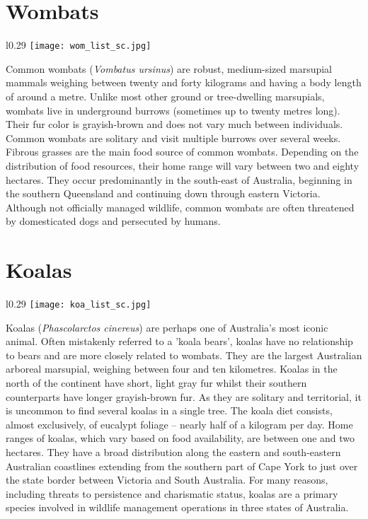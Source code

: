 \newpage
\section{Wombats}\label{wom}
\vspace{-0.3cm}
\setlength\intextsep{0pt}
\begin{wrapfigure}{l}{0.29\textwidth}
\centering
\texttt{[image: wom\_list\_sc.jpg]}
\end{wrapfigure}
Common wombats (\textit{Vombatus ursinus}) are robust, medium-sized marsupial mammals weighing between twenty and forty kilograms and having a body length of around a metre. Unlike most other ground or tree-dwelling marsupials, wombats live in underground burrows (sometimes up to twenty metres long). Their fur color is grayish-brown and does not vary much between individuals. Common wombats are solitary and visit multiple burrows over several weeks. Fibrous grasses are the main food source of common wombats. Depending on the distribution of food resources, their home range will vary between two and eighty hectares. They occur predominantly in the south-east of Australia, beginning in the southern Queensland and continuing down through eastern Victoria. Although not officially managed wildlife, common wombats are often threatened by domesticated dogs and persecuted by humans.

\section{Koalas}\label{koa}
\vspace{-0.3cm}
\setlength\intextsep{0pt}
\begin{wrapfigure}{l}{0.29\textwidth}
\centering
\texttt{[image: koa\_list\_sc.jpg]}
\end{wrapfigure}
Koalas (\textit{Phascolarctos cinereus}) are perhaps one of Australia's most iconic animal. Often mistakenly referred to a 'koala bears', koalas have no relationship to bears and are more closely related to wombats. They are the largest Australian arboreal marsupial, weighing between four and ten kilometres. Koalas in the north of the continent have short, light gray fur whilst their southern counterparts have longer grayish-brown fur. As they are solitary and territorial, it is uncommon to find several koalas in a single tree. The koala diet consists, almost exclusively, of eucalypt foliage -- nearly half of a kilogram per day. Home ranges of koalas, which vary based on food availability, are between one and two hectares. They have a broad distribution along the eastern and south-eastern Australian coastlines extending from the southern part of Cape York to just over the state border between Victoria and South Australia. For many reasons, including threats to persistence and charismatic status, koalas are a primary species involved in wildlife management operations in three states of Australia.

